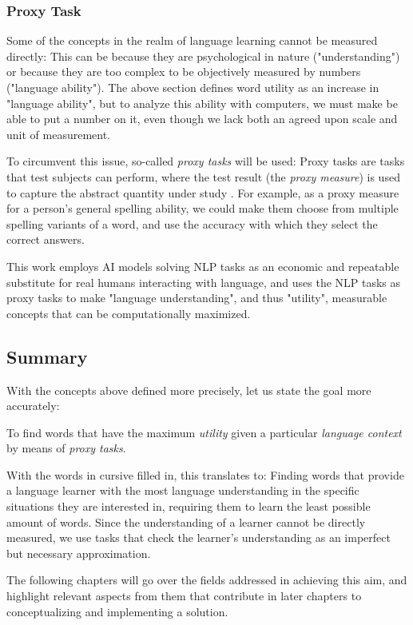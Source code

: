 \subsubsection{Proxy Task}
Some of the concepts in the realm of language learning cannot be measured directly:
This can be because they are psychological in nature ("understanding") or because they are too complex to be objectively measured by numbers ("language ability").
The above section defines word utility as an increase in "language ability", but to analyze this ability with computers, we must make be able to put a number on it, even though we lack both an agreed upon scale and unit of measurement.

To circumvent this issue, so-called \textit{proxy tasks} will be used:
Proxy tasks are tasks that test subjects can perform, where the test result (the \textit{proxy measure}) is used to capture the abstract quantity under study .
For example, as a proxy measure for a person's general spelling ability, we could make them choose from multiple spelling variants of a word, and use the accuracy with which they select the correct answers.

This work employs AI models solving NLP tasks as an economic and repeatable substitute for real humans interacting with language, and uses the NLP tasks as proxy tasks to make "language understanding", and thus "utility", measurable concepts that can be computationally maximized.

\subsection{Summary}
With the concepts above defined more precisely, let us state the goal more accurately:

To find words that have the maximum \textit{utility} given a particular \textit{language context} by means of \textit{proxy tasks}.

With the words in cursive filled in, this translates to:
Finding words that provide a language learner with the most language understanding in the specific situations they are interested in, requiring them to learn the least possible amount of words.
Since the understanding of a learner cannot be directly measured, we use tasks that check the learner's understanding as an imperfect but necessary approximation.

The following chapters will go over the fields addressed in achieving this aim, and highlight relevant aspects from them that contribute in later chapters to conceptualizing and implementing a solution.



